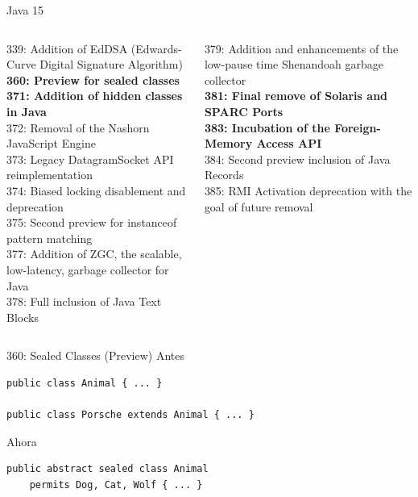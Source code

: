 \documentclass[aspectratio=169]{beamer}
\begin{document}
\begin{frame}[fragile]{Java 15}\scriptsize
    \begin{columns}[T] %
        
        \begin{column}[T]{6cm} %
            339: Addition of EdDSA (Edwards-Curve Digital Signature Algorithm)\\
            \textbf{360: Preview for sealed classes}\\
           \textbf{371: Addition of hidden classes in Java}\\
            372: Removal of the Nashorn JavaScript Engine\\
            373: Legacy DatagramSocket API reimplementation\\
            374: Biased locking disablement and deprecation\\
            375: Second preview for instanceof pattern matching\\
            377: Addition of ZGC, the scalable, low-latency, garbage collector for Java\\
            378: Full inclusion of Java Text Blocks
        \end{column}
        \begin{column}[T]{6cm} %
            379: Addition and enhancements of the low-pause time Shenandoah garbage collector\\
           \textbf{381: Final remove of Solaris and SPARC Ports}\\
            \textbf{383: Incubation of the Foreign-Memory Access API}\\
            384: Second preview inclusion of Java Records\\
            385: RMI Activation deprecation with the goal of future removal
        \end{column}
    \end{columns}
\end{frame}

\begin{frame}[fragile]{360:	Sealed Classes (Preview)}
Antes
\begin{lstlisting}
public class Animal { ... }

public class Porsche extends Animal { ... }
\end{lstlisting}	

Ahora
\begin{lstlisting}
public abstract sealed class Animal
    permits Dog, Cat, Wolf { ... }
\end{lstlisting}	
\end{frame}
\end{document}
